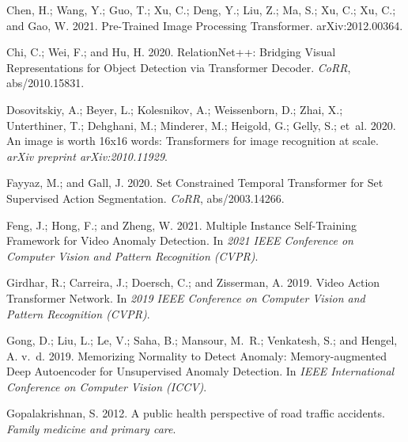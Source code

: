 \documentclass[letterpaper]{article} \usepackage{aaai23}  \usepackage{times}  \usepackage{helvet}  \usepackage{courier}  \usepackage[hyphens]{url}  \usepackage{graphicx} \urlstyle{rm} \def\UrlFont{\rm}  \usepackage{natbib}  \usepackage{caption} \frenchspacing  \setlength{\pdfpagewidth}{8.5in}  \setlength{\pdfpageheight}{11in}  \usepackage{algorithm}
\begin{document}
\begin{thebibliography}{50}
Chen, H.; Wang, Y.; Guo, T.; Xu, C.; Deng, Y.; Liu, Z.; Ma, S.; Xu, C.; Xu, C.;
  and Gao, W. 2021.
\newblock Pre-Trained Image Processing Transformer.
\newblock arXiv:2012.00364.

Chi, C.; Wei, F.; and Hu, H. 2020.
\newblock RelationNet++: Bridging Visual Representations for Object Detection
  via Transformer Decoder.
\newblock \emph{CoRR}, abs/2010.15831.

Dosovitskiy, A.; Beyer, L.; Kolesnikov, A.; Weissenborn, D.; Zhai, X.;
  Unterthiner, T.; Dehghani, M.; Minderer, M.; Heigold, G.; Gelly, S.; et~al.
  2020.
\newblock An image is worth 16x16 words: Transformers for image recognition at
  scale.
\newblock \emph{arXiv preprint arXiv:2010.11929}.

Fayyaz, M.; and Gall, J. 2020.
 Set Constrained Temporal Transformer for Set Supervised Action
  Segmentation.
\newblock \emph{CoRR}, abs/2003.14266.

Feng, J.; Hong, F.; and Zheng, W. 2021.
 Multiple Instance Self-Training Framework for Video Anomaly
  Detection.
\newblock In \emph{2021 IEEE Conference on Computer Vision and Pattern
  Recognition (CVPR)}.

Girdhar, R.; Carreira, J.; Doersch, C.; and Zisserman, A. 2019.
\newblock Video Action Transformer Network.
\newblock In \emph{2019 IEEE Conference on Computer Vision and Pattern
  Recognition (CVPR)}.

Gong, D.; Liu, L.; Le, V.; Saha, B.; Mansour, M.~R.; Venkatesh, S.; and Hengel,
  A. v.~d. 2019.
\newblock Memorizing Normality to Detect Anomaly: Memory-augmented Deep
  Autoencoder for Unsupervised Anomaly Detection.
\newblock In \emph{IEEE International Conference on Computer Vision (ICCV)}.

Gopalakrishnan, S. 2012.
\newblock A public health perspective of road traffic accidents.
\newblock \emph{Family medicine and primary care}.


\end{thebibliography}
\end{document}
